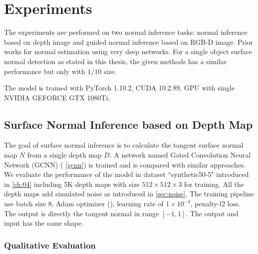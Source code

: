 
\chapter{Experiments} %

\label{ch:05} %
The experiments are performed on two normal inference tasks: normal inference based on depth image and guided normal inference based on RGB-D image. Prior works for normal estimation using very deep networks. For a single object surface normal detection as stated in this thesis, the given methods has a similar performance but only with $ 1/10 $ size.

The model is trained with PyTorch 1.10.2, CUDA 10.2.89, GPU with single NVIDIA GEFORCE GTX 1080Ti.


\section{Surface Normal Inference based on Depth Map}
The goal of surface normal inference is to calculate the tangent surface normal map $ N $ from a single depth map $ D $. A network named Gated Convolution Neural Network (GCNN) ( \ref{gcnn}) is trained and is compared with similar approaches. We evaluate the performance of the model in dataset ``synthetic50-5" introduced in  \ref{ch:04} including 5K depth maps with size  $ 512\times512\times3 $ for training. All the depth maps add simulated noise as introduced in \ref{sec:noise}. The training pipeline use batch size $ 8 $,  Adam optimizer (\cite{adam}), learning rate of  $ 1\times10^{-3} $, penalty-l2 loss. The output is directly the tangent normal in range $ \left[-1,1\right] $. The output and input has the same shape. 

\subsection{Qualitative Evaluation}

